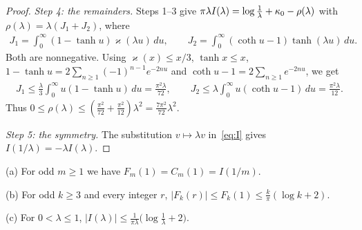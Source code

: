 \begin{proof}
\emph{Step 4: the remainders.} Steps 1--3 give $\pi\lambda I(\lambda)=\log\frac1\lambda+\kappa_0-\rho(\lambda)$ with $\rho(\lambda)=\lambda(J_1+J_2)$, where
\begin{gather*}
J_1=\int_0^\infty(1-\tanh u)\varkappa(\lambda u)\,du,\qquad J_2=\int_0^\infty(\coth u-1)\tanh(\lambda u)\,du.
\end{gather*}
Both are nonnegative. Using $\varkappa(x)\le x/3$, $\tanh x\le x$, $1-\tanh u=2\sum_{n\ge1}(-1)^{n-1}e^{-2nu}$ and $\coth u-1=2\sum_{n\ge1}e^{-2nu}$, we get
\begin{gather*}
J_1\le\frac\lambda3\int_0^\infty u(1-\tanh u)\,du=\frac{\pi^2\lambda}{72},\qquad
J_2\le\lambda\int_0^\infty u(\coth u-1)\,du=\frac{\pi^2\lambda}{12}.
\end{gather*}
Thus $0\le\rho(\lambda)\le(\frac{\pi^2}{72}+\frac{\pi^2}{12})\lambda^2=\frac{7\pi^2}{72}\lambda^2$.

\emph{Step 5: the symmetry.} The substitution $v\mapsto\lambda v$ in~\eqref{eq:I} gives $I(1/\lambda)=-\lambda I(\lambda)$.
\end{proof}

\begin{corollary}\label{cor:Cm1}
\textup{(a)} For odd $m\ge1$ we have $F_m(1)=C_m(1)=I(1/m)$.

\textup{(b)} For odd $k\ge3$ and every integer $r$, $|F_k(r)|\le F_k(1)\le\frac k\pi(\log k+2)$.

\textup{(c)} For $0<\lambda\le1$, $|I(\lambda)|\le\frac1{\pi\lambda}\bigl(\log\frac1\lambda+2\bigr)$.
\end{corollary}

